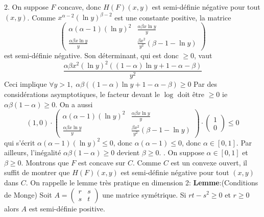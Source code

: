 \documentclass{report}
\begin{document}
2. On suppose $F$ concave, donc $H(F)(x,y)$ est semi-définie négative pour tout $(x,y)$. Comme $x^{\alpha -2}(\ln y)^{\beta-2}$ est une constante positive, la matrice $$\begin{pmatrix}
\alpha(\alpha -1)(\ln y)^2 & \frac{\alpha \beta x\ln y}{y} \\
\frac{\alpha \beta x\ln y}{y} & \frac{\beta x^2}{y^2}(\beta -1 -\ln y)
\end{pmatrix}$$
est semi-définie négative.\newline
Son déterminant, qui est donc $\geq 0$, vaut $$\frac{\alpha \beta x^{2 } (\ln y)^2 ((1-\alpha)\ln y +1 -\alpha-\beta)}{y^2}$$
Ceci implique $\forall y>1,\; \alpha \beta ((1-\alpha)\ln y +1 -\alpha-\beta) \geq 0 $\newline
Par des considérations asymptotiques, le facteur devant le $\log$ doit être $\geq 0$ ie  $\alpha \beta (1-\alpha) \geq 0$. \newline 
\newline
On a aussi $$(1,0)\cdot \begin{pmatrix}
\alpha(\alpha -1)(\ln y)^2 & \frac{\alpha \beta x\ln y}{y} \\
\frac{\alpha \beta x\ln y}{y} & \frac{\beta x^2}{y^2}(\beta -1 -\ln y)
\end{pmatrix} \cdot\begin{pmatrix}
1\\ 0
\end{pmatrix}\leq 0$$
qui s'écrit $\alpha(\alpha-1)(\ln y)^2\leq 0$, donc $\alpha(\alpha-1)\leq 0$, donc $\alpha \in [0,1]$.\newline
Par ailleurs, l'inégalité $\alpha \beta (1-\alpha) \geq 0$ devient $\beta \geq 0$. \newline
{}. On suppose $\alpha \in [0,1]$ et $\beta \geq 0$. Montrons que $F$ est concave sur $C$. Comme $C$ est un convexe ouvert, il suffit de montrer que $H(F)(x,y)$ est semi-définie négative pour tout $(x,y)$ dans $C$.\newline 
On rappelle le lemme très pratique en dimension 2:\newline
\textbf{Lemme}:(Conditions de Monge) \newline 
Soit $A=\begin{pmatrix}
r & s\\
s & t
\end{pmatrix}$ une matrice symétrique.\newline
Si $rt-s^2\geq 0$ et $r\geq 0$ alors $A$ est semi-définie positive.\newline
\end{document}
